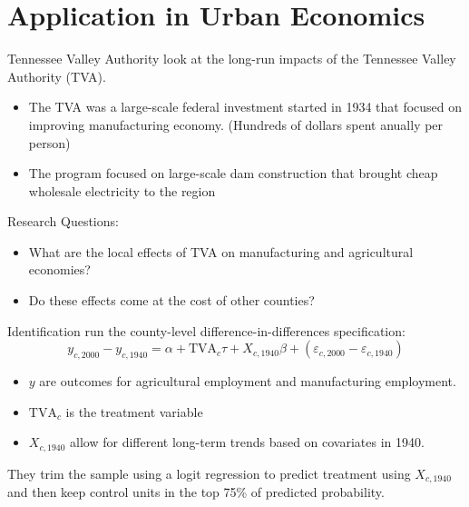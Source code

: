 \documentclass[aspectratio=169]{beamer}
\begin{document}
\section{Application in Urban Economics}

\begin{frame}{Tennessee Valley Authority}
    \citet{Kline_Moretti_2014a} look at the long-run impacts of the Tennessee Valley Authority (TVA).

    \begin{itemize}
        \item The TVA was a large-scale federal investment started in 1934 that focused on improving manufacturing economy. (Hundreds of dollars spent anually per person)
        
        \item The program focused on large-scale dam construction that brought cheap wholesale electricity to the region
    \end{itemize}

    \pause
    Research Questions:
    \begin{itemize}
        \item What are the local effects of TVA on manufacturing and agricultural economies?
        \item Do these effects come at the cost of other counties?
    \end{itemize}
\end{frame}

\begin{frame}{Identification}
    \citet{Kline_Moretti_2014a} run the county-level difference-in-differences  specification: 
    \begin{equation}\label{eq:tva_spillover}
        y_{c, 2000} - y_{c, 1940} = \alpha + \text{TVA}_c \tau + X_{c, 1940} \beta + (\varepsilon_{c, 2000} - \varepsilon_{c, 1940})
    \end{equation} 

    \begin{itemize}
        \item $y$ are outcomes for agricultural employment and manufacturing employment.
        \item $\text{TVA}_c$ is the treatment variable
        \item $X_{c, 1940}$ allow for different long-term trends based on covariates in 1940. 
    \end{itemize}

    They trim the sample using a logit regression to predict treatment using $X_{c,1940}$ and then keep control units in the top 75\% of predicted probability.
\end{frame}
\end{document}
